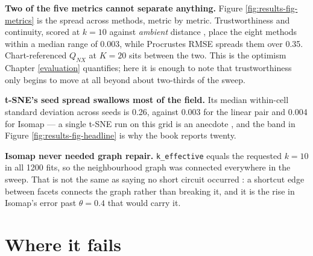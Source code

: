 \documentclass[
  british,
  a4paper,
]{book}
\newenvironment{Shaded}{\begin{snugshade}}{\end{snugshade}}
\newcommand{\FunctionTok}[1]{\textcolor[rgb]{0.13,0.29,0.53}{\textbf{#1}}}
\newcommand{\NormalTok}[1]{#1}
\newcommand{\OtherTok}[1]{\textcolor[rgb]{0.56,0.35,0.01}{#1}}
\newcommand{\SpecialCharTok}[1]{\textcolor[rgb]{0.81,0.36,0.00}{\textbf{#1}}}
\newcommand{\StringTok}[1]{\textcolor[rgb]{0.31,0.60,0.02}{#1}}
\begin{document}
\textbf{Two of the five metrics cannot separate anything.} Figure
\ref{fig:results-fig-metrics} is the spread across methods, metric by metric.
Trustworthiness and continuity, scored at \(k = 10\) against \emph{ambient}
distance \citep{kaski2003trustworthiness}, place the eight methods within a median
range of 0.003, while
Procrustes RMSE spreads them over
0.35. Chart-referenced
\(Q_{NX}\) at \(K = 20\) \citep{lee2009quality} sits between the two. This is the
optimism Chapter \ref{evaluation} quantifies; here it is enough to note that
trustworthiness only begins to move at all beyond about two-thirds of the sweep.

\textbf{t-SNE's seed spread swallows most of the field.} Its median within-cell
standard deviation across seeds is 0.26, against
0.003 for the linear pair and
0.004 for Isomap --- a single t-SNE run on this grid is
an anecdote
\citep{vandermaaten2008tsne}, and the band in Figure \ref{fig:results-fig-headline}
is why the book reports twenty.

\textbf{Isomap never needed graph repair.} \texttt{k\_effective} equals the requested
\(k = 10\) in all 1200 fits, so the
neighbourhood graph was connected everywhere in the sweep. That is not the same
as saying no short circuit occurred \citep{balasubramanian2002isomap}: a shortcut edge
between facets connects the graph rather than breaking it, and it is the rise in
Isomap's error past \(\theta = 0.4\) that would carry it.

\section{Where it fails}\label{results-limits}

\begin{Shaded}
\end{Shaded}
\end{document}
